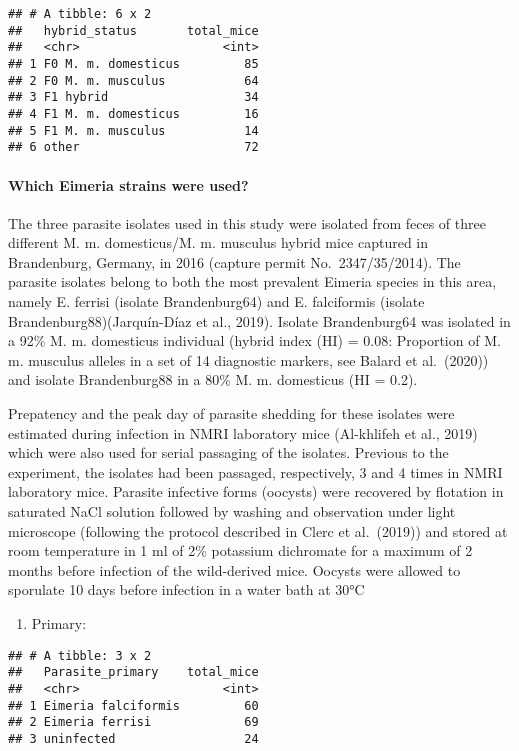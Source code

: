 \documentclass[
]{article}
\providecommand{\tightlist}{%
  \setlength{\itemsep}{0pt}\setlength{\parskip}{0pt}}
\begin{document}
\begin{verbatim}
## # A tibble: 6 x 2
##   hybrid_status       total_mice
##   <chr>                    <int>
## 1 F0 M. m. domesticus         85
## 2 F0 M. m. musculus           64
## 3 F1 hybrid                   34
## 4 F1 M. m. domesticus         16
## 5 F1 M. m. musculus           14
## 6 other                       72
\end{verbatim}

\hypertarget{which-eimeria-strains-were-used}{%
\paragraph{Which Eimeria strains were
used?}\label{which-eimeria-strains-were-used}}

The three parasite isolates used in this study were isolated from feces
of three different M. m. domesticus/M. m. musculus hybrid mice captured
in Brandenburg, Germany, in 2016 (capture permit No.~2347/35/2014). The
parasite isolates belong to both the most prevalent Eimeria species in
this area, namely E. ferrisi (isolate Brandenburg64) and E. falciformis
(isolate Brandenburg88)(Jarquín-Díaz et al., 2019). Isolate
Brandenburg64 was isolated in a 92\% M. m. domesticus individual (hybrid
index (HI) = 0.08: Proportion of M. m. musculus alleles in a set of 14
diagnostic markers, see Balard et al.~(2020)) and isolate Brandenburg88
in a 80\% M. m. domesticus (HI = 0.2).

Prepatency and the peak day of parasite shedding for these isolates were
estimated during infection in NMRI laboratory mice (Al-khlifeh et al.,
2019) which were also used for serial passaging of the isolates.
Previous to the experiment, the isolates had been passaged,
respectively, 3 and 4 times in NMRI laboratory mice. Parasite infective
forms (oocysts) were recovered by flotation in saturated NaCl solution
followed by washing and observation under light microscope (following
the protocol described in Clerc et al.~(2019)) and stored at room
temperature in 1 ml of 2\% potassium dichromate for a maximum of 2
months before infection of the wild-derived mice. Oocysts were allowed
to sporulate 10 days before infection in a water bath at 30°C

\begin{enumerate}
\def\labelenumi{\arabic{enumi}.}
\tightlist
\item
  Primary:
\end{enumerate}

\begin{verbatim}
## # A tibble: 3 x 2
##   Parasite_primary    total_mice
##   <chr>                    <int>
## 1 Eimeria falciformis         60
## 2 Eimeria ferrisi             69
## 3 uninfected                  24
\end{verbatim}
\end{document}
